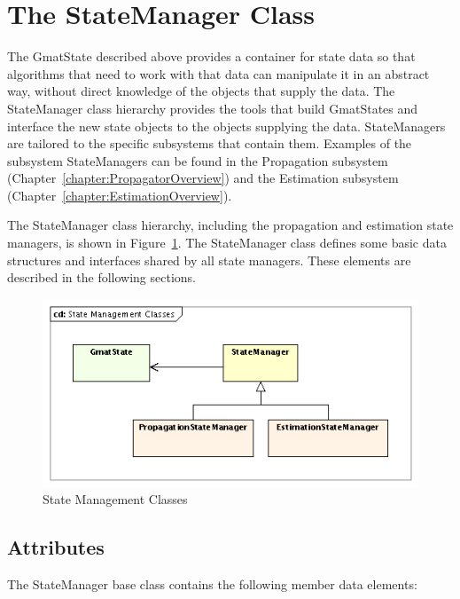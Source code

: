 \section{\label{section:StateManager}The StateManager Class}

The GmatState described above provides a container for state data so that algorithms that need to
work with that data can manipulate it in an abstract way, without direct knowledge of the objects
that supply the data.  The StateManager class hierarchy provides the tools that build GmatStates
and interface the new state objects to the objects supplying the data.  StateManagers are tailored
to the specific subsystems that contain them.  Examples of the subsystem StateManagers can be found
in the Propagation subsystem (Chapter~\ref{chapter:PropagatorOverview}) and the Estimation
subsystem (Chapter~\ref{chapter:EstimationOverview}).

The StateManager class hierarchy, including the propagation and estimation state managers, is shown
in Figure~\ref{figure:StateManagementClasses}.  The StateManager class defines some basic data
structures and interfaces shared by all state managers.  These elements are described in the
following sections.

\begin{figure}[htb]
\begin{center}
\includegraphics[250,125]{Images/StateManagementClasses.png}
\caption{\label{figure:StateManagementClasses}State Management Classes}
\end{center}
\end{figure}

\subsection{Attributes}

The StateManager base class contains the following member data elements:

